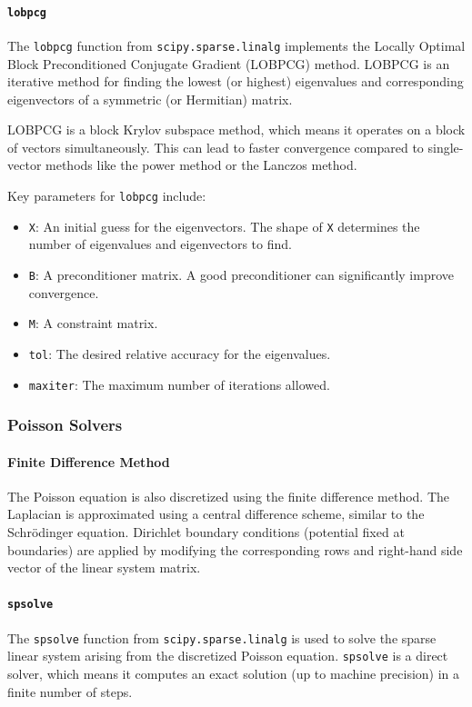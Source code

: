 \documentclass{article}
\begin{document}
\paragraph{\texttt{lobpcg}}
The \texttt{lobpcg} function from \texttt{scipy.sparse.linalg} implements the Locally Optimal Block Preconditioned Conjugate Gradient (LOBPCG) method. LOBPCG is an iterative method for finding the lowest (or highest) eigenvalues and corresponding eigenvectors of a symmetric (or Hermitian) matrix.

LOBPCG is a block Krylov subspace method, which means it operates on a block of vectors simultaneously. This can lead to faster convergence compared to single-vector methods like the power method or the Lanczos method.

Key parameters for \texttt{lobpcg} include:
\begin{itemize}
	\item \texttt{X}: An initial guess for the eigenvectors. The shape of \texttt{X} determines the number of eigenvalues and eigenvectors to find.
	\item \texttt{B}: A preconditioner matrix. A good preconditioner can significantly improve convergence.
	\item \texttt{M}: A constraint matrix.
	\item \texttt{tol}: The desired relative accuracy for the eigenvalues.
	\item \texttt{maxiter}: The maximum number of iterations allowed.
\end{itemize}

\subsubsection{Poisson Solvers}

\paragraph{Finite Difference Method}
The Poisson equation is also discretized using the finite difference method. The Laplacian is approximated using a central difference scheme, similar to the Schrödinger equation. Dirichlet boundary conditions (potential fixed at boundaries) are applied by modifying the corresponding rows and right-hand side vector of the linear system matrix.

\paragraph{\texttt{spsolve}}
The \texttt{spsolve} function from \texttt{scipy.sparse.linalg} is used to solve the sparse linear system arising from the discretized Poisson equation. \texttt{spsolve} is a direct solver, which means it computes an exact solution (up to machine precision) in a finite number of steps.
\end{document}
